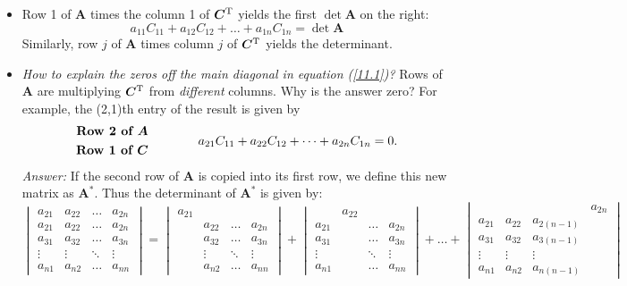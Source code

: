 \begin{itemize}
\item
Row 1 of $\bm A$ times the column 1 of $\bm C^{\mathrm T}$ yields the first $\det\bm A$ on the right:
\[
a_{11}C_{11}+a_{12}C_{12}+\dots+a_{1n}C_{1n}=\det\bm A
\]
Similarly, row $j$ of $\bm A$ times column $j$ of $\bm C^{\mathrm T}$ yields the determinant.
\item
\textit{How to explain the zeros off the main diagonal in equation (\ref{11.1})?} Rows of $\bm A$ are multiplying $\bm C^{\mathrm T}$ from \emph{different} columns. Why is the answer zero? For example, the (2,1)th entry of the result is given by
\[
\begin{aligned}
\text{\textbf{Row 2 of $\bm A$}}\\
\text{\textbf{Row 1 of $\bm C$}}
\end{aligned}
\qquad\qquad
a_{21}C_{11}+a_{22}C_{12}+\dots+a_{2n}C_{1n}=0.
\]
\textit{Answer:} If the second row of $\bm A$ is copied into its first row, we define this new matrix as $\bm A^{*}$. Thus the determinant of $\bm A^{*}$ is given by:
\[
\begin{vmatrix}
a_{21}&a_{22}&\dots&a_{2n}\\
a_{21}&a_{22}&\dots&a_{2n}\\
a_{31}&a_{32}&\dots&a_{3n}\\
\vdots&\vdots&\ddots&\vdots\\
a_{n1}&a_{n2}&\dots&a_{nn}
\end{vmatrix}
=
\begin{vmatrix}
a_{21}&&&\\
&a_{22}&\dots&a_{2n}\\
&a_{32}&\dots&a_{3n}\\
&\vdots&\ddots&\vdots\\
&a_{n2}&\dots&a_{nn}
\end{vmatrix}
+
\begin{vmatrix}
&a_{22}&&\\
a_{21}&&\dots&a_{2n}\\
a_{31}&&\dots&a_{3n}\\
\vdots&&\ddots&\vdots\\
a_{n1}&&\dots&a_{nn}
\end{vmatrix}
+\dots+
\begin{vmatrix}
&&&a_{2n}\\
a_{21}&a_{22}&a_{2(n-1)}&\\
a_{31}&a_{32}&a_{3(n-1)}&\\
\vdots&\vdots&\vdots&\\
a_{n1}&a_{n2}&a_{n(n-1)}&
\end{vmatrix}
\]
\end{itemize}
